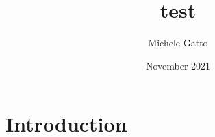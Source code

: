 \documentclass{article}
\title{test}
\author{Michele Gatto}
\date{November 2021}
\begin{document}
\maketitle

\section{Introduction}
\end{document}
